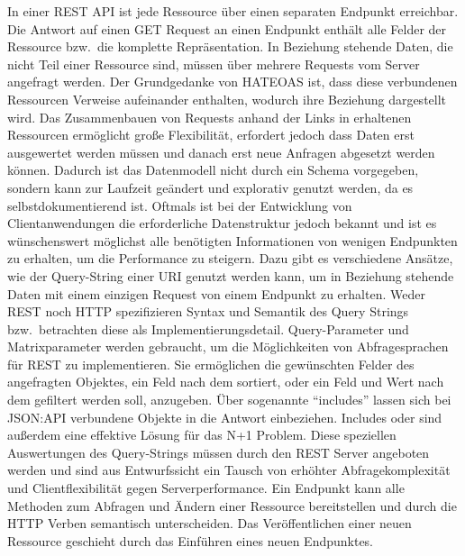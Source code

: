 In einer REST API ist jede Ressource über einen separaten Endpunkt erreichbar.
Die Antwort auf einen GET Request an einen Endpunkt enthält alle Felder der Ressource bzw.\ die komplette Repräsentation.
In Beziehung stehende Daten, die nicht Teil einer Ressource sind, müssen über mehrere Requests vom Server angefragt werden.
Der Grundgedanke von HATEOAS ist, dass diese verbundenen Ressourcen Verweise aufeinander enthalten, wodurch ihre Beziehung dargestellt wird.
Das Zusammenbauen von Requests anhand der Links in erhaltenen Ressourcen ermöglicht große Flexibilität, erfordert jedoch dass Daten erst ausgewertet werden müssen und danach erst neue Anfragen abgesetzt werden können.
Dadurch ist das Datenmodell nicht durch ein Schema vorgegeben, sondern kann zur Laufzeit geändert und explorativ genutzt werden, da es selbstdokumentierend ist.
Oftmals ist bei der Entwicklung von Clientanwendungen die erforderliche Datenstruktur jedoch bekannt und ist es wünschenswert möglichst alle benötigten Informationen von wenigen Endpunkten zu erhalten, um die Performance zu steigern.
Dazu gibt es verschiedene Ansätze, wie der Query-String einer URI genutzt werden kann, um in Beziehung stehende Daten mit einem einzigen Request von einem Endpunkt zu erhalten.
Weder REST noch HTTP spezifizieren Syntax und Semantik des Query Strings bzw.\ betrachten diese als Implementierungsdetail. 
Query-Parameter und Matrixparameter werden gebraucht, um die Möglichkeiten von Abfragesprachen für REST zu implementieren.
Sie ermöglichen \zB{} die gewünschten Felder des angefragten Objektes, ein Feld nach dem sortiert, oder ein Feld und Wert nach dem gefiltert werden soll, anzugeben.
Über sogenannte \enquote{includes} lassen sich bei JSON:API verbundene Objekte in die Antwort einbeziehen.
Includes oder sind außerdem eine effektive Lösung für das N+1 Problem.
Diese speziellen Auswertungen des Query-Strings müssen durch den REST Server angeboten werden und sind aus Entwurfssicht ein Tausch von erhöhter Abfragekomplexität und Clientflexibilität gegen Serverperformance.
Ein Endpunkt kann alle Methoden zum Abfragen und Ändern einer Ressource bereitstellen und durch die HTTP Verben semantisch unterscheiden.
Das Veröffentlichen einer neuen Ressource geschieht durch das Einführen eines neuen Endpunktes.


